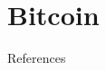 \documentclass{beamer}
\begin{document}
  \section{Bitcoin}
  \begin{frame}{}

  \end{frame}













  \begin{frame}{References}
    \printbibliography
  \end{frame}
\end{document}
